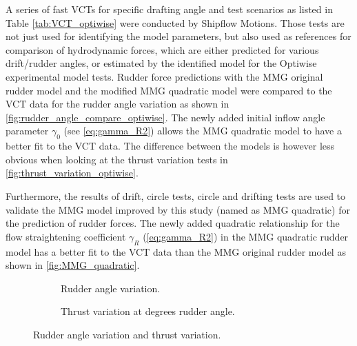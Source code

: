 \noindent A series of fast VCTs for specific drafting angle and test scenarios as listed in Table \ref{tab:VCT_optiwise} were conducted by Shipflow Motions. Those tests are not just used for identifying the model parameters, but also used as references for comparison of hydrodynamic forces, which are either predicted for various drift/rudder angles, or estimated by the identified model for the Optiwise experimental model tests. Rudder force predictions with the MMG original rudder model and the modified MMG quadratic model were compared to the VCT data for the rudder angle variation as shown in \autoref{fig:rudder_angle_compare_optiwise}. The newly added initial inflow angle parameter $\gamma_0$ (see \autoref{eq:gamma_R2}) allows the MMG quadratic model to have a better fit to the VCT data. The difference between the models is however less obvious when looking at the thrust variation tests in \autoref{fig:thrust_variation_optiwise}.

Furthermore, the results of drift, circle tests, circle and drifting tests are used to validate the MMG model improved by this study (named as MMG quadratic) for the prediction of rudder forces.
The newly added quadratic relationship for the flow straightening coefficient $\gamma_R$ (\autoref{eq:gamma_R2}) in the MMG quadratic rudder model has a better fit to the VCT data than the MMG original rudder model as shown in \autoref{fig:MMG_quadratic}.

\begin{figure}[h]
     \centering
     \begin{subfigure}[b]{0.49\textwidth}
         \centering
         
        \caption{Rudder angle variation.}
        \label{fig:rudder_angle_compare_optiwise}
     \end{subfigure}
     \hfill
     \begin{subfigure}[b]{0.49\textwidth}
         \centering
         
        \caption{Thrust variation at  degrees rudder angle.}
        \label{fig:thrust_variation_optiwise}
     \end{subfigure}
    \caption{Rudder angle variation and thrust variation.}
    \label{fig:rudder_angle_compare_optiwise_all}
\end{figure}


